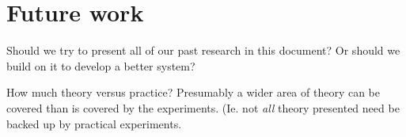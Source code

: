 \section{Future work} %

Should we try to present all of our past research in this document?  Or should we build on it to develop a better system?

How much theory versus practice?  Presumably a wider area of theory can be covered than is covered by the experiments.  (Ie. not {\em all} theory presented need be backed up by practical experiments.



